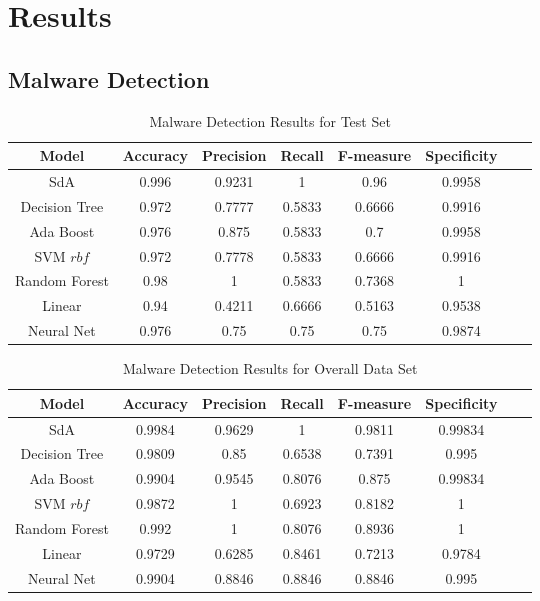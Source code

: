 \chapter{Results}
\thispagestyle{plain}
\label{Results}

\section{Malware Detection}
\label{Malware Detection}

\begin{table}[!htbp]
\caption{Malware Detection Results for Test Set}
\label{malware_binary_detection_test}
\bigskip
\centering
\begin{center}
\begin{tabular}{|c|c|c|c|c|c|c|c|}
\hline
Model & Accuracy & Precision & Recall & F-measure & Specificity  \\ \hline
SdA & 0.996	& 0.9231 & 1 & 0.96	& 0.9958 \\ \hline
Decision Tree & 0.972 & 0.7777	& 0.5833 & 0.6666 & 0.9916 \\ \hline
Ada Boost & 0.976 & 0.875 & 0.5833 & 0.7 & 0.9958 \\ \hline
SVM \(rbf\) & 0.972 & 0.7778 & 0.5833 & 0.6666 & 0.9916 \\ \hline
Random Forest & 0.98 & 1 & 0.5833 & 0.7368 & 1 \\ \hline
Linear & 0.94 & 0.4211 & 0.6666	& 0.5163 & 0.9538\\ \hline
Neural Net & 0.976	& 0.75	& 0.75	& 0.75	& 0.9874  \\ \hline
\end{tabular}
\end{center}
\end{table}


\begin{table}[!htbp]
\caption{Malware Detection Results for Overall Data Set}
\label{malware_binary_detection_overall}
\bigskip
\centering
\begin{center}
\begin{tabular}{|c|c|c|c|c|c|c|c|}
\hline
Model & Accuracy & Precision & Recall & F-measure & Specificity  \\ \hline
SdA & 0.9984 & 0.9629 & 1 & 0.9811 & 0.99834  \\ \hline
Decision Tree & 0.9809 & 0.85 & 0.6538 & 0.7391 & 0.995  \\ \hline
Ada Boost & 0.9904 & 0.9545 & 0.8076 & 0.875 & 0.99834  \\ \hline
SVM \(rbf\) & 0.9872 & 1 & 0.6923 & 0.8182 & 1  \\ \hline
Random Forest & 0.992 & 1 & 0.8076 & 0.8936 & 1  \\ \hline
Linear & 0.9729 & 0.6285 & 0.8461 & 0.7213 & 0.9784  \\ \hline
Neural Net & 0.9904 & 0.8846 & 0.8846 & 0.8846 & 0.995  \\ \hline
\end{tabular}
\end{center}
\end{table}

